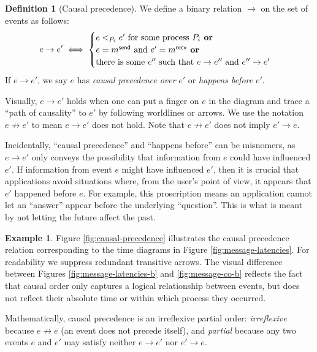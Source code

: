 \documentclass[]             %
{NASA}                       %
\theoremstyle{definition}
\newtheorem{example}[theorem]{Example}
\newtheorem{definition}[theorem]{Definition}
\begin{document}
\begin{definition}[Causal precedence]
  \label{def:causalprecedence}
  We define a binary relation $\to$ on the set of events as follows:
  \[e \to e' \iff
  \begin{cases}
    e <_{P_i} e' \textrm{ for some process $P_i$}
    \textbf{ or} \\
    e = m_{}^{\mathsf{send}} \textrm{ and } e' =m_{}^{\mathsf{recv}}
    \textbf{ or} \\
    \textrm{there is some } e'' \textrm{ such that } e \to e'' \textrm{ and } e'' \to e'
  \end{cases}
  \]
  If $e \to e'$, we say $e$ has \emph{causal precedence over} $e'$ or
  \emph{happens before} $e'$.
\end{definition}
Visually, $e \to e'$ holds when one can put a finger on $e$ in the
diagram and trace a ``path of causality'' to $e'$ by following
worldlines or arrows. We use the notation $e \not \to e'$ to mean
$e \to e'$ does not hold. Note that $e \not \to e'$ does not imply
$e' \to e$.

Incidentally, ``causal precedence'' and ``happens before'' can be
misnomers, as $e \to e'$ only conveys the possibility that information
from $e$ could have influenced $e'$. If information from event $e$
might have influenced $e'$, then it is crucial that applications avoid
situations where, from the user's point of view, it appears that $e'$
happened before $e$. For example, this proscription means an
application cannot let an ``answer'' appear before the underlying
``question''. This is what is meant by not letting the future affect
the past.

\begin{example}
  Figure \ref{fig:causal-precedence} illustrates the causal precedence
  relation corresponding to the time diagrams in Figure
  \ref{fig:message-latencies}. For readability we suppress redundant
  transitive arrows. The visual difference between Figures
  \ref{fig:message-latencies-b} and \ref{fig:message-co-b} reflects
  the fact that causal order only captures a logical relationship
  between events, but does not reflect their absolute time or within
  which process they occurred.
\end{example}

Mathematically, causal precedence is an irreflexive partial order:
\emph{irreflexive} because $e \not \to e$ (an event does not precede
itself), and \emph{partial} because any two events $e$ and $e'$ may
satisfy neither $e \to e'$ nor $e' \to e$.
\end{document}
